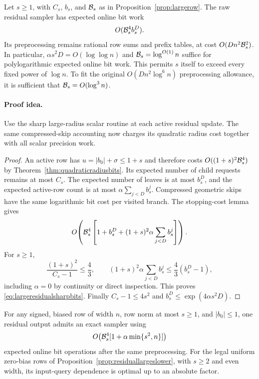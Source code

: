 \begin{corollary}
\label{cor:largeresidualsharpbits}
Let $s\ge1$, with $C_s$, $b_s$, and $\mathcal B_s$ as in
Proposition~\ref{prop:largerow}.
The raw residual sampler has expected online bit work
\begin{equation}\label{eq:largeresidualsharpbits}
 O(\mathcal B_s^4 b_s^D).
\end{equation}
Its preprocessing remains rational row sums and prefix tables,
at cost $O(Dn^2\mathcal B_s^2)$.
In particular, $\alpha s^2D=O(\log\log n)$ and
$\mathcal B_s=\log^{O(1)}n$ suffice for polylogarithmic expected
online bit work. This permits $s$ itself to exceed every fixed
power of $\log n$. To fit the original
$O(Dn^2\log^6n)$ preprocessing allowance, it is sufficient
that $\mathcal B_s=O(\log^3n)$.
\end{corollary}
\paragraph{Proof idea.}
Use the sharp large-radius scalar routine at each active residual update.
The same compressed-skip accounting now charges its quadratic radius cost
together with all scalar precision work.

\begin{proof}
An active row has $u=|b_0|+\sigma\le1+s$ and therefore
costs $O((1+s)^2\mathcal B_s^4)$ by
Theorem~\ref{thm:quadraticradiusbits}.
Its expected number of child requests remains at most $C_s$.
The expected number of leaves is at most $b_s^D$, and the
expected active-row count is at most
$\alpha\sum_{j<D}b_s^j$.
Compressed geometric skips have the same logarithmic bit cost
per visited branch. The stopping-cost lemma gives
\[
 O\!\left(\mathcal B_s^4\left[
 1+b_s^D+(1+s)^2\alpha\sum_{j<D}b_s^j\right]\right).
\]
For $s\ge1$,
\[
 \frac{(1+s)^2}{C_s-1}\le\frac43,
 \qquad
 (1+s)^2\alpha\sum_{j<D}b_s^j
 \le\frac43(b_s^D-1),
\]
including $\alpha=0$ by continuity or direct inspection.
This proves \eqref{eq:largeresidualsharpbits}.
Finally $C_s-1\le4s^2$ and
$b_s^D\le\exp(4\alpha s^2D)$.
\end{proof}

\begin{corollary}
\label{cor:largeresidualonelayerbits}
For any signed, biased row of width $n$, row norm at most
$s\ge1$, and $|b_0|\le1$, one residual output admits an
exact sampler using
\[
 O\!\left(\mathcal B_s^4
 [1+\alpha\min\{s^2,n\}]\right)
\]
expected online bit operations after the same preprocessing.
For the legal uniform zero-bias rows of
Proposition~\ref{prop:residuallargeslower}, with $s\ge2$ and
even width, its input-query dependence is optimal up to an
absolute factor.
\end{corollary}
